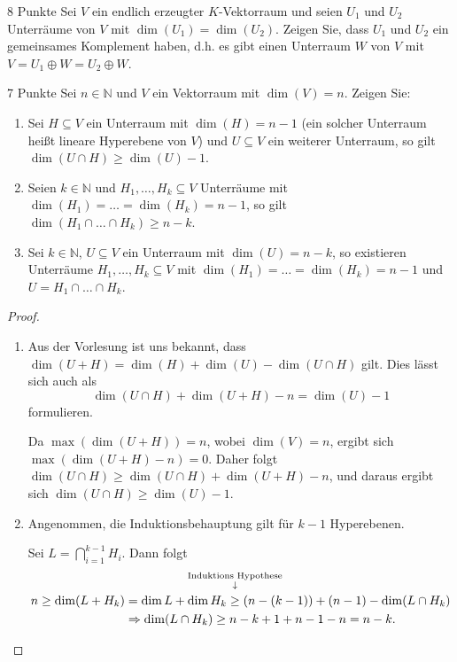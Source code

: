 \documentclass{problemset}
\begin{document}
\begin{problem}{8 Punkte}
Sei $V$ ein endlich erzeugter $K$-Vektorraum und seien $U_1$ und $U_2$ Unterräume von $V$ mit $\dim(U_1) = \dim(U_2)$. Zeigen Sie, dass $U_1$ und $U_2$ ein gemeinsames Komplement haben, d.h. es gibt einen Unterraum $W$ von $V$ mit $V = U_1 \oplus W = U_2 \oplus W$.
\end{problem}

\begin{problem}{7 Punkte}
Sei $n \in \mathbb{N}$ und $V$ ein Vektorraum mit $\dim(V) = n$. Zeigen Sie:
\begin{enumerate}
    \item Sei $H \subseteq V$ ein Unterraum mit $\dim(H) = n - 1$ (ein solcher
          Unterraum heißt lineare Hyperebene von $V$) und $U \subseteq V$ ein
          weiterer Unterraum, so gilt $\dim(U \cap H) \geq \dim(U) - 1$.
    \item Seien $k \in \mathbb{N}$ und $H_1, \ldots, H_k \subseteq V$
          Unterräume mit $\dim(H_1) = \ldots = \dim(H_k) = n - 1$, so gilt
          $\dim(H_1 \cap \ldots \cap H_k) \geq n - k$.
    \item Sei $k \in \mathbb{N}$, $U \subseteq V$ ein Unterraum mit $\dim(U) =
          n - k$, so existieren Unterräume $H_1, \ldots, H_k \subseteq V$ mit
          $\dim(H_1) = \ldots = \dim(H_k) = n - 1$ und $U = H_1 \cap \ldots
          \cap H_k$.
\end{enumerate}

\begin{proof}
    $ $
    \begin{enumerate}
        \item Aus der Vorlesung ist uns bekannt, dass $\dim(U+H) = \dim(H) +
              \dim(U) - \dim(U \cap H)$ gilt. Dies lässt sich auch als \[
                  \dim(U \cap H) + \dim(U + H) - n = \dim(U) - 1
              \] formulieren.

              Da $\max(\dim(U + H)) = n$, wobei $\dim(V) = n$, ergibt sich
              $\max(\dim(U + H) - n) = 0$. Daher folgt $\dim(U \cap H) \ge
              \dim(U \cap H) + \dim(U + H) - n$, und daraus ergibt sich $\dim(U
              \cap H) \geq \dim(U) - 1$.

        \item Angenommen, die Induktionsbehauptung gilt für $k-1$ Hyperebenen.

              Sei $L = \bigcap_{i=1}^{k-1} H_i$. Dann folgt
              \begin{align*}
                  n \ge \dim(L + H_k) & = \dim L + \dim H_k \annotated{Induktions Hypothese}{\ge} (n - (k-1)) + (n-1) - \dim(L \cap H_k) \\
                                      & \Rightarrow \dim(L \cap H_k) \ge n - k + 1 + n - 1 - n = n - k.
              \end{align*}

    \end{enumerate}
\end{proof}
\end{problem}
\end{document}
